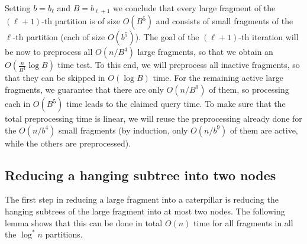 \documentclass[11pt,a4paper]{article}
\theoremstyle{definition}
\theoremstyle{remark}
\begin{document}
\noindent Setting $b=b_{\ell}$ and $B=b_{\ell+1}$  we conclude that every large fragment of the $(\ell+1)$-th partition is of size $O(B^5)$ and consists
of small fragments of the $\ell$-th partition (each of size $O(b^5)$).
The goal of the $(\ell+1)$-th iteration will be now to preprocess all $O(n/B^{4})$ large fragments, so that we obtain an $O(\frac{n}{B^{4}}\log B)$
time test. To this end, we will preprocess all inactive fragments, so that they can be skipped in $O(\log B)$ time. For the remaining active
large fragments, we guarantee that there are only $O(n/B^{9})$ of them, so processing each in $O(B^{5})$ time leads
to the claimed query time. To make sure that the total preprocessing time is linear, we will reuse the preprocessing already done
for the $O(n/b^{4})$ small fragments (by induction, only $O(n/b^{9})$ of them are active, while the others are preprocessed).



\subsection{Reducing a hanging subtree into two nodes}\label{section:lemma1}
The first step in reducing a large fragment into a caterpillar is reducing the hanging subtrees of the large fragment into at most two nodes. The following lemma shows that this can be done in total $O(n)$ time for all fragments in all the $\log^* n$ partitions.
\end{document}
